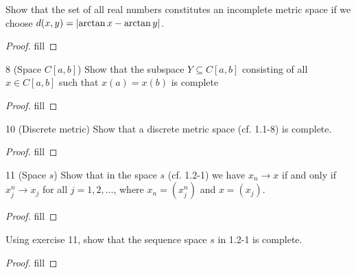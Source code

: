 \begin{exercise}{6}
Show that the set of all real numbers constitutes an incomplete metric space if we choose $d(x,y)=\left\lvert \arctan x-\arctan y\right\rvert$.
\end{exercise}
\begin{proof}
fill
\end{proof}

\begin{exercise}{8 (Space $C[a,b]$)}
Show that the subspace $Y\subseteq C[a,b]$ consisting of all $x\in C[a,b]$ such that $x(a)=x(b)$ is complete
\end{exercise}
\begin{proof}
fill
\end{proof}

\begin{exercise}{10 (Discrete metric)}
Show that a discrete metric space (cf. 1.1-8) is complete.
\end{exercise}
\begin{proof}
fill
\end{proof}

\begin{exercise}{11 (Space $s$)}
Show that in the space $s$ (cf. 1.2-1) we have $x_n\to x$ if and only if $x^n_j\to x_j$ for all $j=1,2,\dots$, where $x_n=(x^n_j)$ and $x=(x_j)$.
\end{exercise}
\begin{proof}
fill
\end{proof}

\begin{exercise}{12}
Using exercise 11, show that the sequence space $s$ in 1.2-1 is complete.
\end{exercise}
\begin{proof}
fill
\end{proof}